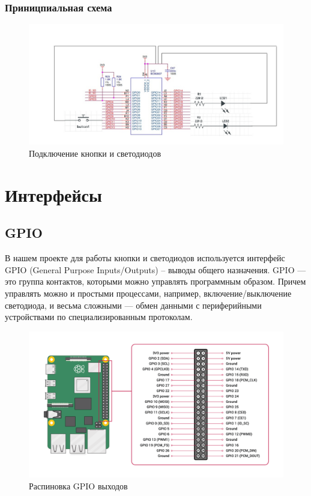 \documentclass[a4paper,11pt]{article}
\begin{document}
\subsubsection{Приницпиальная схема}
\begin{center}
  \begin{figure}[h]
    \includegraphics[scale=0.4]{images/рис_12.jpg}
    \caption{Подключение кнопки и светодиодов}
  \end{figure}
\end{center}

\section{Интерфейсы}
\subsection{GPIO}
В нашем проекте для работы кнопки и светодиодов используется интерфейс GPIO (General Purpose Inputs/Outputs) – выводы общего назначения. GPIO — это группа контактов, которыми можно управлять программным образом. Причем управлять  можно и простыми процессами, например, включение/выключение светодиода, и весьма сложными — обмен данными с периферийными устройствами по специализированным протоколам.

  \begin{figure}[h!]
    \begin{center}
    \includegraphics[scale=0.25]{images/рис_9.png}
    \caption{Распиновка GPIO выходов}
  \end{center}
  \end{figure}
\end{document}
